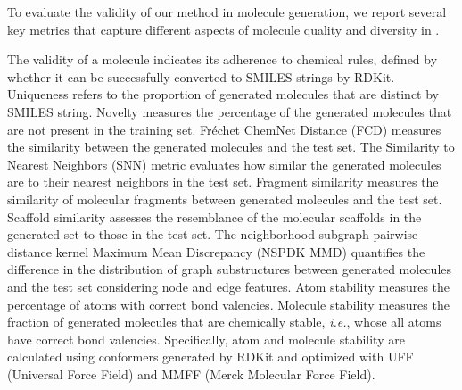 To evaluate the validity of our method in molecule generation, we report several key metrics that capture different aspects of molecule quality and diversity in . 


\begin{table}[!ht]
\centering
\caption{Comparison of the generated molecules of pre-trained GDSS model and SVDD applied on various metrics.}
\label{tab:molecle_metrics}
\end{table}




The validity of a molecule indicates its adherence to chemical rules, defined by whether it can be successfully converted to SMILES strings by RDKit. Uniqueness refers to the proportion of generated molecules that are distinct by SMILES string. Novelty measures the percentage of the generated molecules that are not present in the training set. Fréchet ChemNet Distance (FCD) measures the similarity between the generated molecules and the test set. The Similarity to Nearest Neighbors (SNN) metric evaluates how similar the generated molecules are to their nearest neighbors in the test set. Fragment similarity measures the similarity of molecular fragments between generated molecules and the test set. Scaffold similarity assesses the resemblance of the molecular scaffolds in the generated set to those in the test set. The neighborhood subgraph pairwise distance kernel Maximum Mean Discrepancy (NSPDK MMD) quantifies the difference in the distribution of graph substructures between generated molecules and the test set considering node and edge features. Atom stability measures the percentage of atoms with correct bond valencies. Molecule stability measures the fraction of generated molecules that are chemically stable, \textit{i.e.}, whose all atoms have correct bond valencies. Specifically, atom and molecule stability are calculated using conformers generated by RDKit and optimized with UFF (Universal Force Field) and MMFF (Merck Molecular Force Field). 

